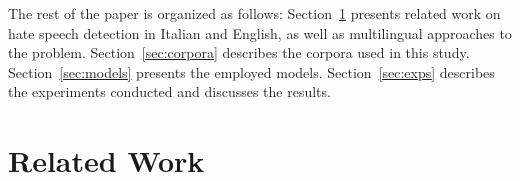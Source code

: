 \documentclass[11pt]{article}
\newcommand{\todoP}[1]{\todo[color=red]{P: #1}}
\newcommand{\mbert}{\mbox{mBERT$_{base}$}}
\newcommand{\umbert}{\mbox{UmBERTo}}
\newcommand{\albert}{\mbox{AlBERTo}}
\newcommand{\enforum}{\textit{Incels.is}}
\newcommand{\itforum}{\textit{Il forum dei brutti}}
\begin{document}
The rest of the paper is organized as follows: Section~\ref{sec:related-work} presents related work on hate speech detection in Italian and English, as well as multilingual approaches to the problem. Section~\ref{sec:corpora} describes the corpora used in this study. Section~\ref{sec:models} presents the employed models. Section~\ref{sec:exps} describes the experiments conducted and discusses the results.






\section{Related Work}
\label{sec:related-work}
\end{document}
